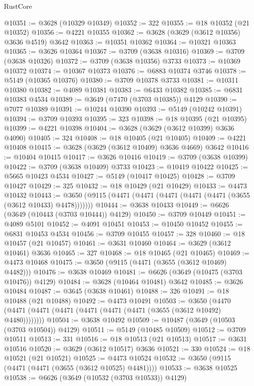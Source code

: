 \begin{lexlean}{RustCore}
\begin{coremodule}
@10351 := @3628 (@10329 @10349)
@10352 := 322
@10355 := @18 @10352 (@21 @10352)
@10356 := @4221 @10355
@10362 := @3628 (@3629 (@3612 @10356) @3636 @4519) @3642
@10363 := @10351 @10362
@10364 := @10321 @10363
@10365 := @3626 @10364
@10367 := @3709 (@3638 @10316)
@10369 := @3709 (@3638 @10326)
@10372 := @3709 (@3638 @10356) @3733
@10373 := @10369 @10372
@10374 := @10367 @10373
@10376 := @6883 @10374 @3746
@10378 := @5149 (@10365 @10376)
@10380 := @3709 @10378 @3733
@10381 := @10311 @10380
@10382 := @4089 @10381
@10383 := @6433 @10382
@10385 := @6831 @10383 @4534
@10389 := @3649 (@7470 (@3703 @10385)) @4129
@10390 := @7077 @10389
@10391 := @10244 @10390
@10393 := @5149 (@10242 @10391)
@10394 := @3709 @10393
@10395 := 323
@10398 := @18 @10395 (@21 @10395)
@10399 := @4221 @10398
@10404 := @3628 (@3629 (@3612 @10399) @3636 @4090)
@10405 := 324
@10408 := @18 @10405 (@21 @10405)
@10409 := @4221 @10408
@10415 := @3628 (@3629 (@3612 @10409) @3636 @4669) @3642
@10416 := @10404 @10415
@10417 := @3626 @10416
@10419 := @3709 (@3638 @10399)
@10422 := @3709 (@3638 @10409) @3733
@10423 := @10419 @10422
@10425 := @5665 @10423 @4534
@10427 := @5149 (@10417 @10425)
@10428 := @3709 @10427
@10429 := 325
@10432 := @18 @10429 (@21 @10429)
@10433 := @4473 @10432
@10443 := @3650 (@9115 (@4471 (@4471 (@4471 (@4471 (@4471 (@3655 (@3612 @10433) @4478)))))))
@10444 := @3638 @10433
@10449 := @6626 (@3649 (@10443 (@3703 @10444)) @4129)
@10450 := @3709 @10449
@10451 := @4089 @5101
@10452 := @4091 @10451
@10453 := @10450 @10452
@10455 := @6831 @10453 @4534
@10456 := @3709 @10455
@10457 := 328
@10460 := @18 @10457 (@21 @10457)
@10461 := @3631 @10460
@10464 := @3629 (@3612 @10461) @3636
@10465 := 327
@10468 := @18 @10465 (@21 @10465)
@10469 := @4473 @10468
@10475 := @3650 (@9115 (@4471 (@3655 (@3612 @10469) @4482)))
@10476 := @3638 @10469
@10481 := @6626 (@3649 (@10475 (@3703 @10476)) @4129)
@10484 := @3628 (@10464 @10481) @3642
@10485 := @3626 @10484
@10487 := @3645 (@3638 @10461)
@10488 := 326
@10491 := @18 @10488 (@21 @10488)
@10492 := @4473 @10491
@10503 := @3650 (@4470 (@4471 (@4471 (@4471 (@4471 (@4471 (@4471 (@3655 (@3612 @10492) @4480))))))))
@10504 := @3638 @10492
@10509 := @10487 (@3649 (@10503 (@3703 @10504)) @4129)
@10511 := @5149 (@10485 @10509)
@10512 := @3709 @10511
@10513 := 331
@10516 := @18 @10513 (@21 @10513)
@10517 := @3631 @10516
@10520 := @3629 (@3612 @10517) @3636
@10521 := 330
@10524 := @18 @10521 (@21 @10521)
@10525 := @4473 @10524
@10532 := @3650 (@9115 (@4471 (@4471 (@3655 (@3612 @10525) @4481))))
@10533 := @3638 @10525
@10538 := @6626 (@3649 (@10532 (@3703 @10533)) @4129)

\end{coremodule}
\end{lexlean}
